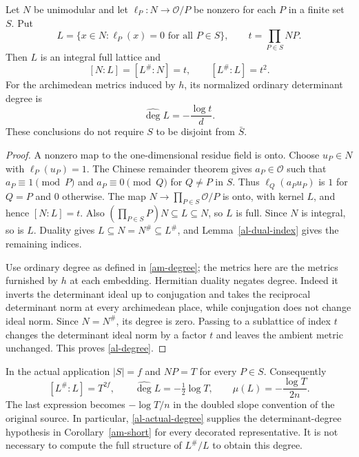 \begin{proposition}\label{al-kernel}
Let $N$ be unimodular and let $\ell_P:N\to\mathcal O/P$
be nonzero for each $P$ in a finite set $S$. Put
\[
 L=\{x\in N:\ell_P(x)=0\text{ for all }P\in S\},
       \qquad t=\prod_{P\in S}NP.
\]
Then $L$ is an integral full lattice and
\begin{equation}\label{al-indices}
 [N:L]=[L^\#:N]=t,\qquad [L^\#:L]=t^2.
\end{equation}
For the archimedean metrics induced by $h$, its normalized ordinary
determinant degree is
\begin{equation}\label{al-degree}
                         \widehat{\deg}L=-\frac{\log t}{d}.
\end{equation}
These conclusions do not require $S$ to be disjoint from $\bar S$.
\end{proposition}
\begin{proof}
A nonzero map to the one-dimensional residue field is onto.
Choose $u_P\in N$ with $\ell_P(u_P)=1$.
The Chinese remainder theorem gives $a_P\in\mathcal O$ such that
$a_P\equiv1\pmod P$ and $a_P\equiv0\pmod Q$ for $Q\ne P$ in $S$.
Thus $\ell_Q(a_Pu_P)$ is $1$ for $Q=P$ and $0$ otherwise.
The map $N\to\prod_{P\in S}\mathcal O/P$ is onto, with kernel
$L$, and hence $[N:L]=t$. Also
$(\prod_{P\in S}P)N\subseteq L\subseteq N$, so $L$ is full.
Since $N$ is integral, so is $L$. Duality gives
$L\subseteq N=N^\#\subseteq L^\#$, and
Lemma~\ref{al-dual-index} gives the remaining indices.

Use ordinary degree as defined in \eqref{am-degree}; the metrics
here are the metrics furnished by $h$ at each embedding.
Hermitian duality negates degree. Indeed it inverts the determinant
ideal up to conjugation and takes the reciprocal determinant norm
at every archimedean place, while conjugation does not change ideal
norm. Since $N=N^\#$, its degree is zero.
Passing to a sublattice of index $t$ changes the determinant ideal
norm by a factor $t$ and leaves the ambient metric unchanged.
This proves \eqref{al-degree}.
\end{proof}

In the actual application $|S|=f$ and $NP=T$ for every $P\in S$.
Consequently
\begin{equation}\label{al-actual-degree}
 [L^\#:L]=T^{2f},\qquad
 \widehat{\deg}L=-\tfrac12\log T,\qquad
 \mu(L)=-\frac{\log T}{2n}.
\end{equation}
The last expression becomes $-\log T/n$ in the doubled slope
convention of the original source. In particular,
\eqref{al-actual-degree} supplies the determinant-degree hypothesis
in Corollary~\ref{am-short} for every decorated representative.
It is not necessary to compute the full structure of $L^\#/L$
to obtain this degree.

